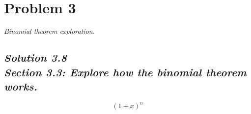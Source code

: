 \documentclass[a4paper, 12pt]{article}
\numberwithin{equation}{section}
\begin{document}
\noindent\makebox[\linewidth]{\rule{\linewidth}{1pt}}
\section{Problem 3}
\emph{Binomial theorem exploration.}
\subsection*{\emph{Solution 3.8\\Section 3.3: Explore how the binomial theorem works.}}

\begin{equation}
\left( 1 + x\right)^n
\end{equation}
\end{document}
